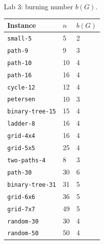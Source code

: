 \documentclass[11pt]{article}
\begin{document}
Lab 3: burning number $b(G)$.

\begin{center}
\small
\begin{tabular}{lll}
\toprule
Instance & $n$ & $b(G)$ \\
\midrule
\mbox{\texttt{small-{}5}} & 5 & 2 \\
\mbox{\texttt{path-{}9}} & 9 & 3 \\
\mbox{\texttt{path-{}10}} & 10 & 4 \\
\mbox{\texttt{path-{}16}} & 16 & 4 \\
\mbox{\texttt{cycle-{}12}} & 12 & 4 \\
\mbox{\texttt{petersen}} & 10 & 3 \\
\mbox{\texttt{binary-{}tree-{}15}} & 15 & 4 \\
\mbox{\texttt{ladder-{}8}} & 16 & 4 \\
\mbox{\texttt{grid-{}4x4}} & 16 & 4 \\
\mbox{\texttt{grid-{}5x5}} & 25 & 4 \\
\mbox{\texttt{two-{}paths-{}4}} & 8 & 3 \\
\mbox{\texttt{path-{}30}} & 30 & 6 \\
\mbox{\texttt{binary-{}tree-{}31}} & 31 & 5 \\
\mbox{\texttt{grid-{}6x6}} & 36 & 5 \\
\mbox{\texttt{grid-{}7x7}} & 49 & 5 \\
\mbox{\texttt{random-{}30}} & 30 & 4 \\
\mbox{\texttt{random-{}50}} & 50 & 4 \\
\bottomrule
\end{tabular}
\end{center}
\end{document}
